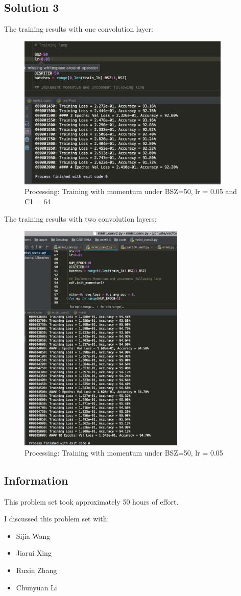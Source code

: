 \documentclass{article}
\newcommand{\info}{\clearpage \subsection*{Information}}
\newcommand{\solution}[1]{\clearpage \subsection*{Solution #1}}  %
\begin{document}
\solution{3}
The training results with one convolution layer:
\begin{figure}[h!]
  \centering
	\includegraphics[height=20em]{screenshots/prob350-005-64.png}
	\caption{Processing: Training with momentum under BSZ=50, lr = 0.05 and C1 = 64}
\end{figure}
\newline
The training results with two convolution layers:
\begin{figure}[h!]
  \centering
	\includegraphics[height=30em]{screenshots/prob3-50-001.png}
	\caption{Processing: Training with momentum under BSZ=50, lr = 0.05}
\end{figure}
\info

This problem set took approximately 50 hours of effort.

I discussed this problem set with:
\begin{itemize}
\item Sijia Wang
\item Jiarui Xing
\item Ruxin Zhang
\item Chunyuan Li
\end{itemize}
\end{document}
